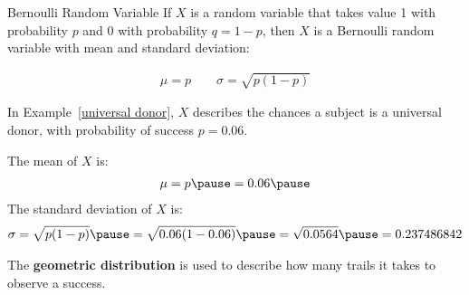 \documentclass{beamer}
\begin{document}
\begin{frame}
  \begin{block}{Bernoulli Random Variable}
    If $X$ is a random variable that takes value 1 with probability $p$ and 0 with probability $q=1-p$, then $X$ is a Bernoulli random variable with mean and standard deviation:

    \vspace{-4mm}
    \begin{equation*}
      \begin{aligned}
        \mu=p
        \qquad
        \sigma=\sqrt{p(1-p)}
      \end{aligned}
    \end{equation*}
  \end{block}\pause

  \begin{example}
    In Example~\ref{universal donor}, $X$ describes the chances a subject is a universal donor, with probability of success $p=0.06$.\pause

    \vspace{1mm}
    The mean of $X$ is:
    \begin{equation*}
      \begin{aligned}
        \mu=p\pause
        =0.06\pause
      \end{aligned}
    \end{equation*}
    The standard deviation of $X$ is:
    \begin{equation*}
      \begin{aligned}
        \sigma = \sqrt{p(1-p)}\pause
        =\sqrt{0.06(1-0.06)}\pause
        =\sqrt{0.0564}\pause
        =0.237486842
      \end{aligned}
    \end{equation*}
  \end{example}
\end{frame}

\begin{frame}
  \begin{definition}
    The \textbf{geometric distribution} is used to describe how many trails it takes to observe a success.
  \end{definition}
\end{frame}
\end{document}
